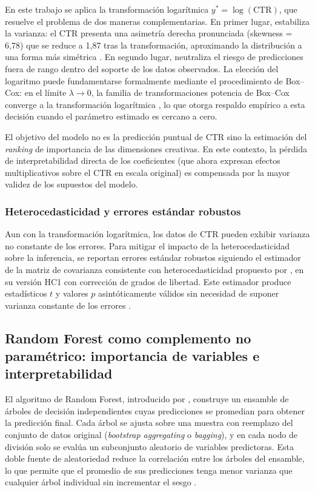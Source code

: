 \documentclass[12pt, a4paper]{report}
\begin{document}
En este trabajo se aplica la transformación logarítmica $y^* = \log(\text{CTR})$,
que resuelve el problema de dos maneras complementarias. En primer lugar, estabiliza
la varianza: el CTR presenta una asimetría derecha pronunciada (skewness = 6{,}78)
que se reduce a 1{,}87 tras la transformación, aproximando la distribución a una forma
más simétrica \citep[Cap.~12]{fox2016}. En segundo lugar, neutraliza el riesgo de
predicciones fuera de rango dentro del soporte de los datos observados. La elección
del logaritmo puede fundamentarse formalmente mediante el procedimiento de Box--Cox:
en el límite $\lambda \to 0$, la familia de transformaciones potencia de Box--Cox
converge a la transformación logarítmica \citep[Cap.~12]{fox2016}, lo que otorga
respaldo empírico a esta decisión cuando el parámetro estimado es cercano a cero.

El objetivo del modelo no es la predicción puntual de CTR sino la estimación del
\textit{ranking} de importancia de las dimensiones creativas. En este contexto,
la pérdida de interpretabilidad directa de los coeficientes (que ahora expresan
efectos multiplicativos sobre el CTR en escala original) es compensada por la
mayor validez de los supuestos del modelo.

\subsubsection*{Heterocedasticidad y errores estándar robustos}

Aun con la transformación logarítmica, los datos de CTR pueden exhibir varianza
no constante de los errores. Para mitigar el impacto de la heterocedasticidad sobre
la inferencia, se reportan errores estándar robustos siguiendo el estimador de la
matriz de covarianza consistente con heterocedasticidad propuesto por \citet{white1980},
en su versión HC1 con corrección de grados de libertad. Este estimador produce
estadísticos $t$ y valores $p$ asintóticamente válidos sin necesidad de suponer
varianza constante de los errores \citep[Cap.~12]{fox2016}.

\subsection{Random Forest como complemento no paramétrico:
            importancia de variables e interpretabilidad}

El algoritmo de Random Forest, introducido por \citet{breiman2001}, construye un
ensamble de árboles de decisión independientes cuyas predicciones se promedian para
obtener la predicción final. Cada árbol se ajusta sobre una muestra con reemplazo del
conjunto de datos original (\textit{bootstrap aggregating} o \textit{bagging}), y en
cada nodo de división solo se evalúa un subconjunto aleatorio de variables predictoras.
Esta doble fuente de aleatoriedad reduce la correlación entre los árboles del ensamble,
lo que permite que el promedio de sus predicciones tenga menor varianza que cualquier
árbol individual sin incrementar el sesgo \citep{breiman2001}.
\end{document}
